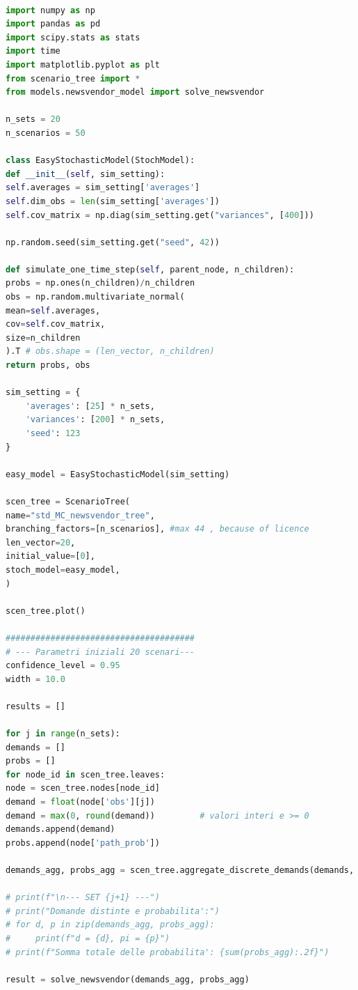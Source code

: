 \documentclass[a4paper,12pt]{article}
\begin{document}
\begin{lstlisting}[language=python,caption={Main of Newvendor problem},label={lst:main-nv}]

import numpy as np
import pandas as pd
import scipy.stats as stats
import time
import matplotlib.pyplot as plt
from scenario_tree import *
from models.newsvendor_model import solve_newsvendor

n_sets = 20           
n_scenarios = 50      

class EasyStochasticModel(StochModel):
def __init__(self, sim_setting):
self.averages = sim_setting['averages']
self.dim_obs = len(sim_setting['averages'])
self.cov_matrix = np.diag(sim_setting.get("variances", [400]))

np.random.seed(sim_setting.get("seed", 42))

def simulate_one_time_step(self, parent_node, n_children):
probs = np.ones(n_children)/n_children
obs = np.random.multivariate_normal(
mean=self.averages,
cov=self.cov_matrix,
size=n_children
).T # obs.shape = (len_vector, n_children)
return probs, obs 

sim_setting = {
	'averages': [25] * n_sets,  
	'variances': [200] * n_sets,
	'seed': 123
}

easy_model = EasyStochasticModel(sim_setting)

scen_tree = ScenarioTree(
name="std_MC_newsvendor_tree",
branching_factors=[n_scenarios], #max 44 , because of licence
len_vector=20,
initial_value=[0],
stoch_model=easy_model,
)

scen_tree.plot()

######################################
# --- Parametri iniziali 20 scenari---
confidence_level = 0.95
width = 10.0

results = []

for j in range(n_sets):
demands = []
probs = []
for node_id in scen_tree.leaves:
node = scen_tree.nodes[node_id]
demand = float(node['obs'][j])         
demand = max(0, round(demand))         # valori interi e >= 0
demands.append(demand)
probs.append(node['path_prob'])

demands_agg, probs_agg = scen_tree.aggregate_discrete_demands(demands, probs)

# print(f"\n--- SET {j+1} ---")
# print("Domande distinte e probabilita':")
# for d, p in zip(demands_agg, probs_agg):
#     print(f"d = {d}, pi = {p}")
# print(f"Somma totale delle probabilita': {sum(probs_agg):.2f}")

result = solve_newsvendor(demands_agg, probs_agg)


\end{lstlisting}
\end{document}
